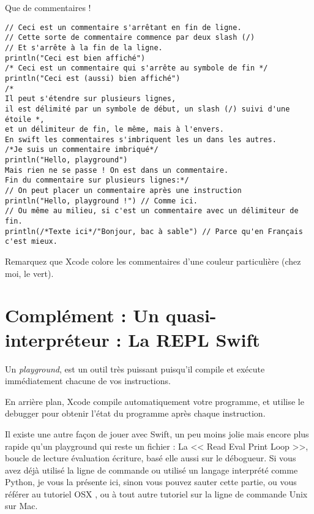 \begin{listing}[H]
\caption{Que de commentaires !}
\begin{verbatim}
// Ceci est un commentaire s'arrêtant en fin de ligne.
// Cette sorte de commentaire commence par deux slash (/)
// Et s'arrête à la fin de la ligne.
println("Ceci est bien affiché")
/* Ceci est un commentaire qui s'arrête au symbole de fin */
println("Ceci est (aussi) bien affiché")
/*
Il peut s'étendre sur plusieurs lignes,
il est délimité par un symbole de début, un slash (/) suivi d'une étoile *,
et un délimiteur de fin, le même, mais à l'envers.
En swift les commentaires s'imbriquent les un dans les autres.
/*Je suis un commentaire imbriqué*/
println("Hello, playground")
Mais rien ne se passe ! On est dans un commentaire.
Fin du commentaire sur plusieurs lignes:*/
// On peut placer un commentaire après une instruction
println("Hello, playground !") // Comme ici.
// Ou même au milieu, si c'est un commentaire avec un délimiteur de fin.
println(/*Texte ici*/"Bonjour, bac à sable") // Parce qu'en Français c'est mieux.
\end{verbatim}
\end{listing}
Remarquez que Xcode colore les commentaires d'une couleur particulière (chez moi, le vert).

\section{Complément : Un quasi-interpréteur : La REPL Swift}
Un \emph{playground}, est un outil très puissant
puisqu’il compile et exécute immédiatement
chacune de vos instructions.

En arrière plan, Xcode compile automatiquement votre programme,
et utilise le debugger pour obtenir l’état du programme après chaque instruction.

Il existe une autre façon de jouer avec Swift,
un peu moins jolie mais encore plus rapide qu’un playground
qui reste un fichier :
La << Read Eval Print Loop >>, boucle de lecture évaluation écriture,
basé elle aussi sur le débogueur.
Si vous avez déjà utilisé la ligne de commande
ou utilisé un langage interprété comme Python,
je vous la présente ici, sinon vous pouvez sauter cette partie,
ou vous référer au tutoriel OSX ,
ou à tout autre tutoriel sur la ligne de commande Unix sur Mac.

